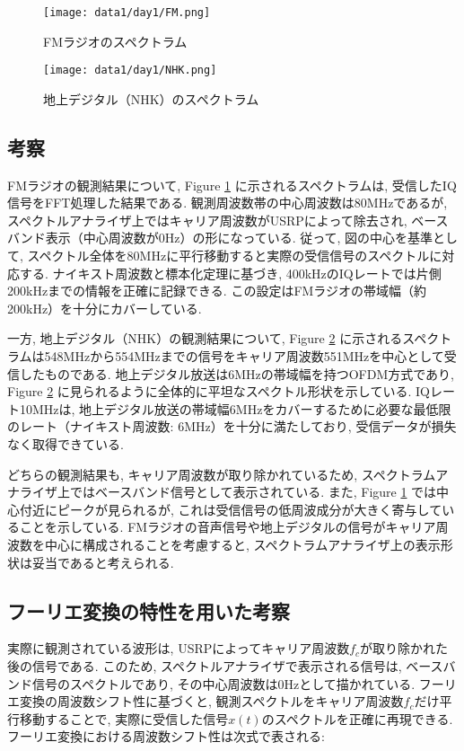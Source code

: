 \documentclass[a4paper, twocolumn]{article} %
\begin{document}
\begin{figure}[H]
    \centering
    \texttt{[image: data1/day1/FM.png]}
    \caption{FMラジオのスペクトラム}
    \label{fig:fm_spectrum}
\end{figure}

\begin{figure}[H]
    \centering
    \texttt{[image: data1/day1/NHK.png]}
    \caption{地上デジタル（NHK）のスペクトラム}
    \label{fig:nhk_spectrum}
\end{figure}

\subsection{考察}
FMラジオの観測結果について, Figure \ref{fig:fm_spectrum} に示されるスペクトラムは, 受信したIQ信号をFFT処理した結果である. 観測周波数帯の中心周波数は80MHzであるが, スペクトルアナライザ上ではキャリア周波数がUSRPによって除去され, ベースバンド表示（中心周波数が0Hz）の形になっている. 従って, 図の中心を基準として, スペクトル全体を80MHzに平行移動すると実際の受信信号のスペクトルに対応する. ナイキスト周波数と標本化定理に基づき, 400kHzのIQレートでは片側200kHzまでの情報を正確に記録できる. この設定はFMラジオの帯域幅（約200kHz）を十分にカバーしている.

一方, 地上デジタル（NHK）の観測結果について, Figure \ref{fig:nhk_spectrum} に示されるスペクトラムは548MHzから554MHzまでの信号をキャリア周波数551MHzを中心として受信したものである. 地上デジタル放送は6MHzの帯域幅を持つOFDM方式であり, Figure \ref{fig:nhk_spectrum} に見られるように全体的に平坦なスペクトル形状を示している. IQレート10MHzは, 地上デジタル放送の帯域幅6MHzをカバーするために必要な最低限のレート（ナイキスト周波数: 6MHz）を十分に満たしており, 受信データが損失なく取得できている.

どちらの観測結果も, キャリア周波数が取り除かれているため, スペクトラムアナライザ上ではベースバンド信号として表示されている. また, Figure \ref{fig:fm_spectrum} では中心付近にピークが見られるが, これは受信信号の低周波成分が大きく寄与していることを示している. FMラジオの音声信号や地上デジタルの信号がキャリア周波数を中心に構成されることを考慮すると, スペクトラムアナライザ上の表示形状は妥当であると考えられる.

\subsection{フーリエ変換の特性を用いた考察}
実際に観測されている波形は, USRPによってキャリア周波数\(f_c\)が取り除かれた後の信号である. このため, スペクトルアナライザで表示される信号は, ベースバンド信号のスペクトルであり, その中心周波数は0Hzとして描かれている. フーリエ変換の周波数シフト性に基づくと, 観測スペクトルをキャリア周波数\(f_c\)だけ平行移動することで, 実際に受信した信号\(x(t)\)のスペクトルを正確に再現できる. フーリエ変換における周波数シフト性は次式で表される:
\end{document}

